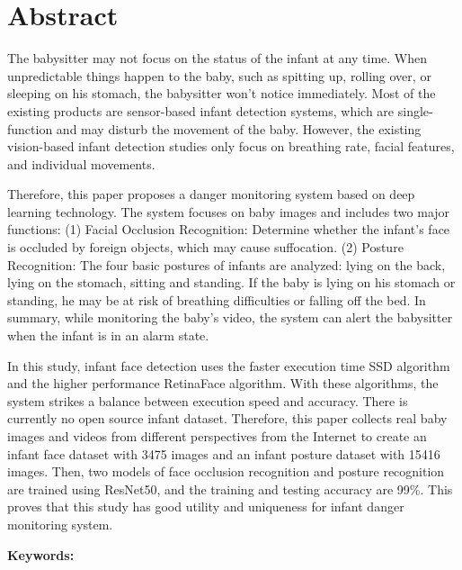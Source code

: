 \documentclass[class=NCU_thesis, crop=false]{standalone}
\begin{document}
\chapter{Abstract}
The babysitter may not focus on the status of the infant at any time.
When unpredictable things happen to the baby, such as spitting up, rolling over, or sleeping on his stomach, 
the babysitter won't notice immediately. 
Most of the existing products are sensor-based infant detection systems, 
which are single-function and may disturb the movement of the baby.
However, the existing vision-based infant detection studies only focus on breathing rate, facial features, and individual movements.

Therefore, this paper proposes a danger monitoring system based on deep learning technology.
The system focuses on baby images and includes two major functions:
(1) Facial Occlusion Recognition: Determine whether the infant's face is occluded by foreign objects, which may cause suffocation.
(2) Posture Recognition: The four basic postures of infants are analyzed: lying on the back, lying on the stomach, sitting and standing.
If the baby is lying on his stomach or standing, he may be at risk of breathing difficulties or falling off the bed.
In summary, while monitoring the baby's video, the system can alert the babysitter when the infant is in an alarm state.

In this study, infant face detection uses the faster execution time SSD algorithm and the higher performance RetinaFace algorithm.
With these algorithms, the system strikes a balance between execution speed and accuracy.
There is currently no open source infant dataset.
Therefore, this paper collects real baby images and videos from different perspectives from the Internet to create an infant face dataset with 3475 images and an infant posture dataset with 15416 images.
Then, two models of face occlusion recognition and posture recognition are trained using ResNet50, 
and the training and testing accuracy are 99\%.
This proves that this study has good utility and uniqueness for infant danger monitoring system.

\vspace{2em}
\noindent \textbf{Keywords:} \keywordsEn{} %
\end{document}
